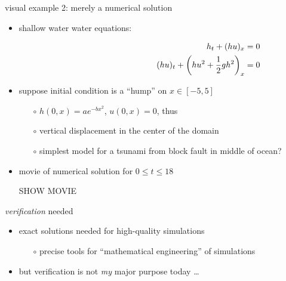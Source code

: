 \documentclass[10pt,hyperref]{beamer}
\begin{document}
\begin{frame}{visual example 2: merely a numerical solution}

\begin{itemize}
\item shallow water water equations:

\vspace{-11.5mm}
\begin{align*}
\hspace{60mm} h_t + (hu)_x &= 0 \\
(hu)_t + \left(h u^2 + \frac{1}{2} g h^2\right)_x &= 0
\end{align*}
\item suppose initial condition is a ``hump'' on $x\in[-5,5]$
    \begin{itemize}
    \item[$\circ$] $h(0,x)=a e^{-bx^2}$, $u(0,x)=0$, thus
    \item[$\circ$] vertical displacement in the center of the domain
    \item[$\circ$] simplest model for a tsunami from block fault in middle of ocean?
    \end{itemize}
\item movie of numerical solution for $0 \le t \le 18$

\vspace{10mm}
\begin{center}
\alert{SHOW MOVIE}
\end{center}

\vspace{10mm}

\end{itemize}
\end{frame}


\begin{frame}{\emph{verification} needed}

\begin{itemize}
\item exact solutions needed for high-quality simulations
    \begin{itemize}
    \item[$\circ$] precise tools for ``mathematical engineering'' of simulations
    \end{itemize}
\item but verification is not \emph{my} major purpose today \dots
\end{itemize}
\end{frame}
\end{document}
